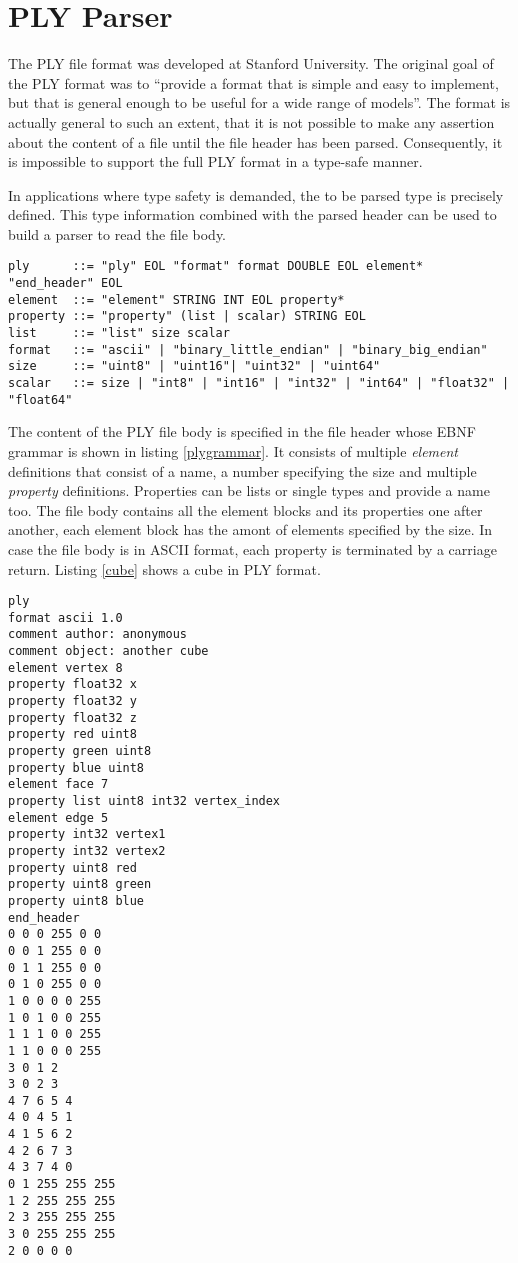 \section{PLY Parser}

The PLY file format was developed at Stanford University. The original goal of
the PLY format was to ``provide a format that is simple and easy to implement,
but that is general enough to be useful for a wide range of models''. The format
is actually general to such an extent, that it is not possible to make any
assertion about the content of a file until the file header has been parsed.
Consequently, it is impossible to support the full PLY format in a type-safe
manner.

In applications where type safety is demanded, the to be parsed type is
precisely defined. This type information combined with the parsed header can be
used to build a parser to read the file body.

\begin{lstlisting}[float=*,label=plygrammar,frame=tb,caption=EBNF Grammar of the PLY file header]
ply      ::= "ply" EOL "format" format DOUBLE EOL element* "end_header" EOL
element  ::= "element" STRING INT EOL property*
property ::= "property" (list | scalar) STRING EOL
list     ::= "list" size scalar
format   ::= "ascii" | "binary_little_endian" | "binary_big_endian"
size     ::= "uint8" | "uint16"| "uint32" | "uint64"
scalar   ::= size | "int8" | "int16" | "int32" | "int64" | "float32" | "float64"
\end{lstlisting}

The content of the PLY file body is specified in the file header whose EBNF
grammar is shown in listing \ref{plygrammar}. It consists of multiple
\emph{element} definitions that consist of a name, a number specifying the size
and multiple \emph{property} definitions. Properties can be lists or single
types and provide a name too. The file body contains all the element blocks and
its properties one after another, each element block has the amont of elements
specified by the size. In case the file body is in ASCII format, each property
is terminated by a carriage return. Listing \ref{cube} shows a cube in PLY
format.

\begin{lstlisting}[label=cube,frame=tb,caption=PLY definition of a cube]
ply
format ascii 1.0
comment author: anonymous
comment object: another cube
element vertex 8
property float32 x
property float32 y
property float32 z
property red uint8
property green uint8
property blue uint8
element face 7
property list uint8 int32 vertex_index
element edge 5
property int32 vertex1
property int32 vertex2
property uint8 red
property uint8 green
property uint8 blue
end_header
0 0 0 255 0 0
0 0 1 255 0 0
0 1 1 255 0 0
0 1 0 255 0 0
1 0 0 0 0 255
1 0 1 0 0 255
1 1 1 0 0 255
1 1 0 0 0 255
3 0 1 2
3 0 2 3
4 7 6 5 4
4 0 4 5 1
4 1 5 6 2
4 2 6 7 3
4 3 7 4 0
0 1 255 255 255
1 2 255 255 255
2 3 255 255 255
3 0 255 255 255
2 0 0 0 0
\end{lstlisting}

